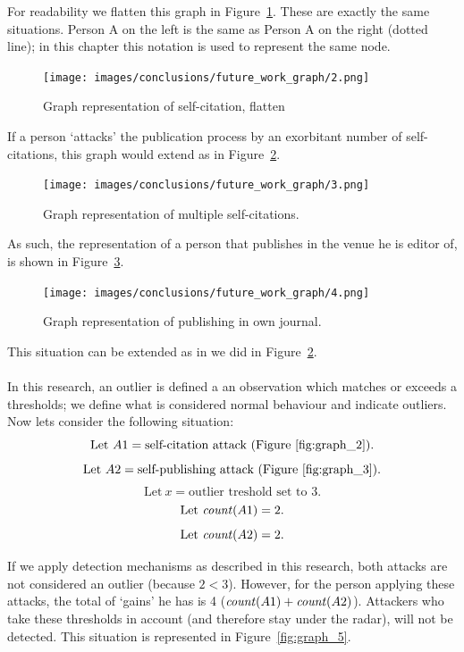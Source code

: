 \documentclass{ou-report}
\begin{document}
For readability we flatten this graph in Figure~\ref{fig:graph_2}. These are 
exactly the same situations. Person A on the left is the same as Person A on
the right (dotted line); in this chapter this notation is used to represent
the same node.

\begin{figure}[H]
    \centering
    \texttt{[image: images/conclusions/future\_work\_graph/2.png]}
    \caption{Graph representation of self-citation, flatten}
    \label{fig:graph_2}
\end{figure}

If a person `attacks' the publication process by an exorbitant number of 
self-citations, this graph would extend as in Figure~\ref{fig:graph_3}.

\begin{figure}[H]
    \centering
    \texttt{[image: images/conclusions/future\_work\_graph/3.png]}
    \caption{Graph representation of multiple self-citations.}
    \label{fig:graph_3}
\end{figure}

As such, the representation of a person that publishes in the venue he is 
editor of, is shown in Figure~\ref{fig:graph_4}.

\begin{figure}[H]
    \centering
    \texttt{[image: images/conclusions/future\_work\_graph/4.png]}
    \caption{Graph representation of publishing in own journal.}
    \label{fig:graph_4}
\end{figure}

This situation can be extended as in we did in Figure~\ref{fig:graph_3}.


\newcommand{\ewcount}{\mi{count}}
\paragraph{}
In this research, an outlier is defined a an observation which matches or 
exceeds a thresholds; we define what is considered normal behaviour and 
indicate outliers. Now lets consider the following situation:
\[ \text{Let}\ A1=\text{self-citation attack (Figure~\ref{fig:graph_2})}. \] 
\[ \text{Let}\ A2=\text{self-publishing attack (Figure~\ref{fig:graph_3})}. \] 
\[ \text{Let}\ x=\text{outlier treshold set to 3}. \]
\[ \text{Let}\ \ewcount(A1)=2. \]
\[ \text{Let}\ \ewcount(A2)=2. \]

If we apply detection mechanisms as described in this research, both attacks 
are not considered an outlier (because $2 < 3$).
However, for the person applying these attacks, the total of `gains' he has
is 4 ($\ewcount(A1) + \ewcount(A2)$). Attackers who take these thresholds in 
account (and therefore stay under the radar), will not be detected. This 
situation is represented in Figure~\ref{fig:graph_5}.
\end{document}
